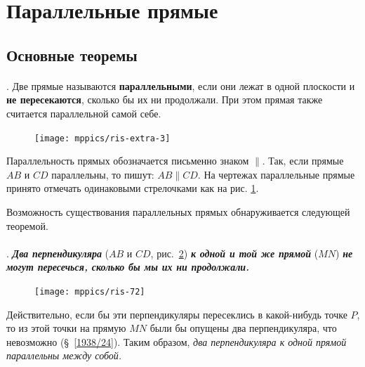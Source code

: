 \documentclass[oneside]{book}
\makeatletter
\newcommand{\rindex}[2][\imki@jobname]{%
  \index[#1]{\detokenize{#2}}%
}
\makeatother
\begin{document}
\section{Параллельные прямые}

\subsection*{Основные теоремы}

\paragraph{}\label{1938/70}
.
Две прямые называются \rindex{параллельные прямые}\textbf{параллельными}, если они лежат в одной плоскости и \textbf{не пересекаются}, сколько бы их ни продолжали.
При этом прямая также считается параллельной самой себе.

{

\begin{figure}
\centering
\texttt{[image: mppics/ris-extra-3]}
\caption{}\label{extra/ris-3}
\end{figure}

Параллельность прямых обозначается письменно знаком $\parallel$.
Так, если прямые $AB$ и $CD$ параллельны, то пишут:
$AB \parallel CD$. 
На чертежах параллельные прямые принято отмечать одинаковыми стрелочками как на рис. \ref{extra/ris-3}.

Возможность существования параллельных прямых обнаруживается следующей теоремой.

}

\paragraph{}\label{1938/71}
\mbox{.}
\textbf{\emph{Два перпендикуляра}} ($AB$ и $CD$, рис.~\ref{1938/ris-72}) \textbf{\emph{к одной и той же прямой}} ($MN$) \textbf{\emph{не могут пересечься, сколько бы мы их ни продолжали.}}

\begin{figure}
\centering
\texttt{[image: mppics/ris-72]}
\caption{}\label{1938/ris-72}
\end{figure}

Действительно, если бы эти перпендикуляры пересеклись в какой-нибудь точке $P$, то из этой точки на прямую $MN$ были бы опущены два перпендикуляра, что невозможно (§~\ref{1938/24}).
Таким образом, \emph{два перпендикуляра к одной прямой параллельны между собой.}
\end{document}
